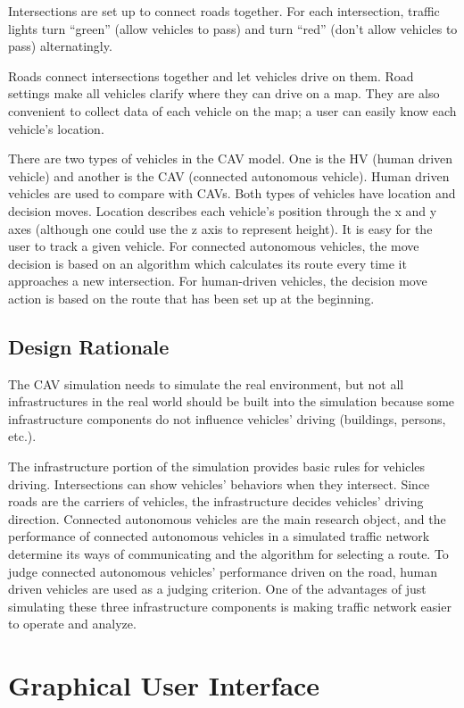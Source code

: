 \documentclass[onecolumn, draftclsnofoot,10pt, compsoc]{IEEEtran}
\begin{document}
Intersections are set up to connect roads together.
For each intersection, traffic lights turn “green” (allow vehicles to pass) and turn “red” (don’t allow vehicles to pass) alternatingly.

Roads connect intersections together and let vehicles drive on them.
Road settings make all vehicles clarify where they can drive on a map.
They are also convenient to collect data of each vehicle on the map; a user can easily know each vehicle’s location.

There are two types of vehicles in the CAV model.
One is the HV (human driven vehicle) and another is the CAV (connected autonomous vehicle).
Human driven vehicles are used to compare with CAVs.
Both types of vehicles have location and decision moves.
Location describes each vehicle’s position through the x and y axes (although one could use the z axis to represent height).
It is easy for the user to track a given vehicle.
For connected autonomous vehicles, the move decision is based on an algorithm which calculates its route every time it approaches a new intersection.
For human-driven vehicles, the decision move action is based on the route that has been set up at the beginning.
\subsection{Design Rationale}
The CAV simulation needs to simulate the real environment, but not all infrastructures in the real world should be built into the simulation because some infrastructure components do not influence vehicles’ driving (buildings, persons, etc.).

The infrastructure portion of the simulation provides basic rules for vehicles driving.
Intersections can show vehicles’ behaviors when they intersect.
Since roads are the carriers of vehicles, the infrastructure decides vehicles’ driving direction.
Connected autonomous vehicles are the main research object, and the performance of connected autonomous vehicles in a simulated traffic network determine its ways of communicating and the algorithm for selecting a route.
To judge connected autonomous vehicles’ performance driven on the road, human driven vehicles are used as a judging criterion.
One of the advantages of just simulating these three infrastructure components is making traffic network easier to operate and analyze.
\section{Graphical User Interface}
\end{document}
